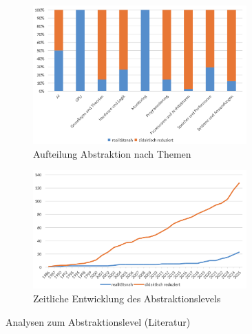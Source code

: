 \begin{figure}[!htbp]
    \centering
    \begin{subfigure}[b]{0.48\textwidth}
        \centering
        \includegraphics[width=0.90\textwidth]{graphics_lit/7-abtraktion-themen.png}
        \caption{Aufteilung Abstraktion nach Themen}
        \label{fig:7-abstraktion-themen}
    \end{subfigure}
    \hfill
    \begin{subfigure}[b]{0.48\textwidth}
        \centering
        \includegraphics[width=0.90\textwidth]{graphics_lit/8-abstraktion-jahr.png}
        \caption{Zeitliche Entwicklung des Abstraktionslevels}
        \label{fig:8-abstraktion-jahr}
    \end{subfigure}
    \caption{Analysen zum Abstraktionslevel (Literatur)}
    \label{fig:abstaktion-analysen}
\end{figure}

